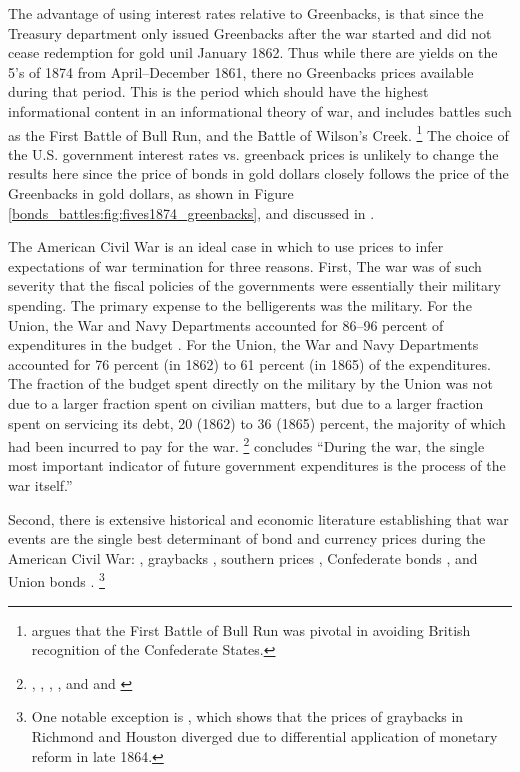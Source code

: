 The advantage of using interest rates relative to Greenbacks, is that since the Treasury department only issued Greenbacks after the war started and did not cease redemption for gold unil January 1862.
Thus while there are yields on the 5's of 1874 from April--December 1861, there no Greenbacks prices available during that period.
This is the period which should have the highest informational content in an informational theory of war, and includes battles such as the First Battle of Bull Run, and the Battle of Wilson's Creek.%
\footnote{\textcite{Poast2012} argues that the First Battle of Bull Run was pivotal in avoiding British recognition of the Confederate States.}
The choice of the U.S. government interest rates vs. greenback prices is unlikely to change the results here since the price of bonds in gold dollars closely follows the price of the Greenbacks in gold dollars, as shown in Figure \ref{bonds_battles:fig:fives1874_greenbacks}, and discussed in \textcite{Roll1972}.

The American Civil War is an ideal case in which to use prices to
infer expectations of war termination for three reasons. %
First, The war was of such severity that the fiscal policies of the
governments were essentially their military spending. %
The primary expense to the belligerents was the military. %
For the Union, the War and Navy Departments accounted for 86--96
percent of expenditures in the budget \parencites[][259]{Ball1991}[see
also][354-355]{BurdekinLangdana1993}. %
For the Union, the War and Navy Departments accounted for 76 percent
(in 1862) to 61 percent (in 1865) of the expenditures. %
The fraction of the budget spent directly on the military by the Union
was not due to a larger fraction spent on civilian matters, but due to
a larger fraction spent on servicing its debt, 20 (1862) to 36 (1865)
percent, the majority of which had been incurred to pay for the war.%
\footnote{%
  \textcite{Treasury1861a}, \textcite{Treasury1861b},
  \textcite{Treasury1862}, \textcite{Treasury1863}, and
  \textcite{Treasury1864} and \textcite{Treasury1865} %
} %
\parencite[][668]{McCandless1996} concludes ``During the war, the
single most important indicator of future government expenditures is
the process of the war itself.''%

Second, there is extensive historical and economic literature
establishing that war events are the single best determinant of bond
and currency prices during the American Civil War:
\parencites{Mitchell1903}{Mitchell1908}{Calomiris1988}{WillardGuinnaneEtAl1996}{McCandless1996}{SmithSmith1997},
graybacks \parencites{Schwab1901}{Weidenmier2002}, southern prices
\parencite{BurdekinLangdana1993}, Confederate bonds
\parencites{DavisPecquet1990}{BrownBurdekin2000}{OosterlinckWeidenmier2007},
and Union bonds \parencite{Roll1972}.%
\footnote{One notable exception is \textcite{BurdekinWeidenmier2001},
  which shows that the prices of graybacks in Richmond and Houston
  diverged due to differential application of monetary reform in late
  1864.}

